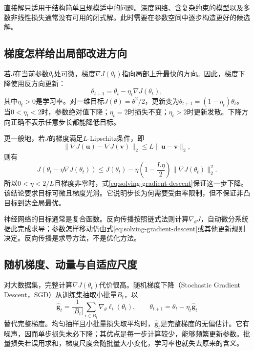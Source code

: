 直接解只适用于结构简单且规模适中的问题。深度网络、含复杂约束的模型以及多数非线性损失通常没有可用的闭式解。此时需要在参数空间中逐步构造更好的候选解。

\subsection{梯度怎样给出局部改进方向}
若$J$在当前参数$\theta_t$处可微，梯度$\nabla J(\theta_t)$指向局部上升最快的方向。因此，梯度下降使用反方向更新：
\begin{equation}
 \theta_{t+1}=\theta_t-\eta_t\nabla J(\theta_t),
 \label{eq:solving-gradient-descent}
\end{equation}
其中$\eta_t>0$是学习率。对一维目标$J(\theta)=\theta^2/2$，更新变为$\theta_{t+1}=(1-\eta_t)\theta_t$。当$0<\eta_t<2$时，参数绝对值下降；$\eta_t=2$时损失不变；$\eta_t>2$时更新发散。下降方向正确不表示任意步长都能降低目标。

更一般地，若$J$的梯度满足$L$-Lipschitz条件，即
\begin{equation}
 \|\nabla J(\bm u)-\nabla J(\bm v)\|_2\leq L\|\bm u-\bm v\|_2,
\end{equation}
则有
\begin{equation}
 J(\theta_t-\eta\nabla J(\theta_t))
 \leq J(\theta_t)-\eta\left(1-\frac{L\eta}{2}\right)
 \|\nabla J(\theta_t)\|_2^2.
 \label{eq:solving-descent-bound}
\end{equation}
所以$0<\eta<2/L$且梯度非零时，式\eqref{eq:solving-gradient-descent}保证这一步下降。该结论要求目标可微且梯度光滑。它说明步长为何需要受曲率限制，但不保证非凸目标到达全局最优。

神经网络的目标通常是复合函数。反向传播按照链式法则计算$\nabla_\theta J$，自动微分系统据此完成求导；参数怎样移动仍由式\eqref{eq:solving-gradient-descent}或其他更新规则决定。反向传播是求导方法，不是优化方法。

\subsection{随机梯度、动量与自适应尺度}
对大数据集，完整计算$\nabla J(\theta_t)$代价很高。随机梯度下降（Stochastic Gradient Descent，SGD）从训练集抽取小批量$B_t$，以
\begin{equation}
 \hat{\bm g}_t=\frac{1}{|B_t|}\sum_{i\in B_t}\nabla_\theta\ell_i(\theta_t),
 \qquad \theta_{t+1}=\theta_t-\eta_t\hat{\bm g}_t
 \label{eq:solving-sgd}
\end{equation}
替代完整梯度。均匀抽样且小批量损失取平均时，$\hat{\bm g}_t$是完整梯度的无偏估计。它有噪声，因而单步损失未必下降；其优点是每一步计算较少，能够频繁更新参数。批量损失若误用求和，梯度尺度会随批量大小变化，学习率也就失去原来的含义。

